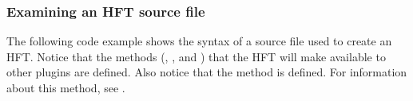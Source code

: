 \documentclass[letterpaper,12pt,english,openany,oneside]{sphinxmanual}
\begin{document}
\subsubsection{Examining an HFT source file}
\label{\detokenize{Plugins_Hft:examining-an-hft-source-file}}
The following code example shows the syntax of a source file used to create an HFT. Notice that the methods (, , and  ) that the HFT will make available to other plugins are defined. Also notice that the  method is defined. For information about this method, see .
\end{document}
